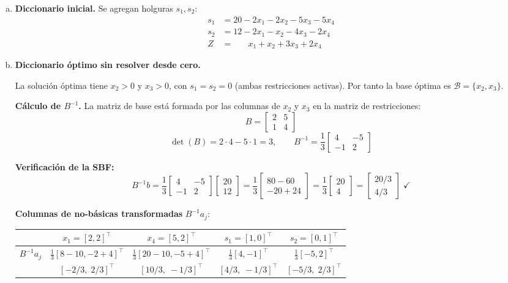 \documentclass{article}
\begin{document}
\begin{enumerate}[a)]

\item \textbf{Diccionario inicial.} Se agregan holguras $s_1,s_2$:
$$\begin{aligned}
s_1 &= 20 - 2x_1 - 2x_2 - 5x_3 - 5x_4 \\
s_2 &= 12 - 2x_1 - x_2  - 4x_3 - 2x_4 \\
Z   &= \phantom{0+{}}x_1 + x_2 + 3x_3 + 2x_4
\end{aligned}$$

\item \textbf{Diccionario óptimo sin resolver desde cero.}

La solución óptima tiene $x_2>0$ y $x_3>0$, con $s_1=s_2=0$ (ambas restricciones activas). Por tanto la base óptima es $\mathcal{B}=\{x_2,x_3\}$.

\textbf{Cálculo de $B^{-1}$.} La matriz de base está formada por las columnas de $x_2$ y $x_3$ en la matriz de restricciones:
$$B=\begin{bmatrix}2&5\\1&4\end{bmatrix}$$
$$\det(B)=2\cdot4-5\cdot1=3,\qquad B^{-1}=\frac{1}{3}\begin{bmatrix}4&-5\\-1&2\end{bmatrix}$$

\textbf{Verificación de la SBF:}
$$B^{-1}b=\frac{1}{3}\begin{bmatrix}4&-5\\-1&2\end{bmatrix}\begin{bmatrix}20\\12\end{bmatrix}=\frac{1}{3}\begin{bmatrix}80-60\\-20+24\end{bmatrix}=\frac{1}{3}\begin{bmatrix}20\\4\end{bmatrix}=\begin{bmatrix}20/3\\4/3\end{bmatrix}\;\checkmark$$

\textbf{Columnas de no-básicas transformadas} $B^{-1}a_j$:

\begin{center}
\renewcommand{\arraystretch}{1.4}
\begin{tabular}{lcccc}
\hline
 & $x_1=[2,2]^\top$ & $x_4=[5,2]^\top$ & $s_1=[1,0]^\top$ & $s_2=[0,1]^\top$\\
\hline
$B^{-1}a_j$ & $\frac{1}{3}[8-10,-2+4]^\top$ & $\frac{1}{3}[20-10,-5+4]^\top$ & $\frac{1}{3}[4,-1]^\top$ & $\frac{1}{3}[-5,2]^\top$\\
& $[-2/3,\;2/3]^\top$ & $[10/3,\;-1/3]^\top$ & $[4/3,\;-1/3]^\top$ & $[-5/3,\;2/3]^\top$\\
\hline
\end{tabular}
\end{center}


\end{enumerate}
\end{document}
